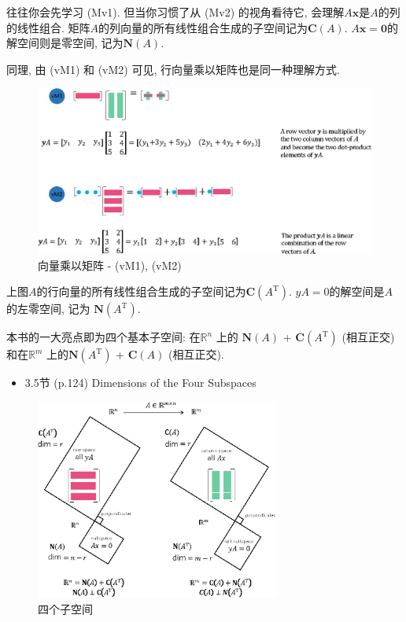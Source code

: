 \documentclass[letterpaper]{article}
\DeclareRobustCommand\transp{^{\mathrm{T}}}
\begin{document}
往往你会先学习 (Mv1). 但当你习惯了从 (Mv2) 的视角看待它, 会理解$A\bm{x}$是$A$的列的线性组合. 
矩阵$A$的列向量的所有线性组合生成的子空间记为$\mathbf{C}(A)$. 
$A\bm{x}=\bm{0}$的解空间则是零空间, 记为$\mathbf{N}(A)$. 


同理, 由 (vM1) 和 (vM2) 可见, 行向量乘以矩阵也是同一种理解方式. 

\begin{figure}[H]
  \centering
  \includegraphics[scale=0.8]{VectorTimesMatrix.eps}
  \caption{向量乘以矩阵 - (vM1), (vM2)}
\end{figure}

上图$A$的行向量的所有线性组合生成的子空间记为$\mathbf{C}(A\transp)$. 
$yA=0$的解空间是$A$的左零空间, 记为 $\mathbf{N}(A\transp)$. 


本书的一大亮点即为四个基本子空间: 在$\mathbb{R}^n$ 上的
$\mathbf{N}(A)$ + $\mathbf{C}(A\transp)$ (相互正交) 
和在$\mathbb{R}^m$ 上的$\mathbf{N}(A\transp)$ + $\mathbf{C}(A)$ (相互正交). 


\begin{itemize}
  \item 3.5节 (p.124) Dimensions of the Four Subspaces
\end{itemize} 

\begin{figure}[H]
  \centering
  \includegraphics[keepaspectratio, width=8cm]{4-Subspaces.eps}
  \caption{四个子空间}
\end{figure}
\end{document}

